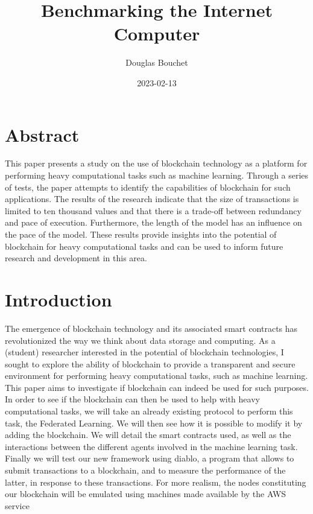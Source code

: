 \documentclass{article}
\title{Benchmarking the Internet Computer}
\date{2023-02-13}
\author{Douglas Bouchet}
\begin{document}
\maketitle
\newpage
{}

\tableofcontents

\newpage
\section{Abstract}
This paper presents a study on the use of blockchain technology as a platform for performing heavy computational tasks
such as machine learning. Through a series of tests, the paper attempts to identify the capabilities of blockchain for
such applications. The results of the research indicate that the size of transactions is limited to ten thousand values
and that there is a trade-off between redundancy and pace of execution. Furthermore, the length of the model has an
influence on the pace of the model. These results provide insights into the potential of blockchain for heavy
computational tasks and can be used to inform future research and development in this area.
\newpage
\section{Introduction}
The emergence of blockchain technology and its associated smart contracts has revolutionized the way we think about data
storage and computing. As a (student) researcher interested in the potential of blockchain technologies, I sought to explore the
ability of blockchain to provide a transparent and secure environment for performing heavy computational tasks, such
as machine learning. This paper aims to investigate if blockchain can indeed be used for such purposes.
In order to see if the blockchain can then be used to help with heavy computational tasks, we will take an already
existing protocol to perform this task, the Federated Learning. We will then see how it is possible to modify it by adding the blockchain.
We will detail the smart contracts used, as well as the interactions between the different agents involved in the
machine learning task. Finally we will test our new framework using diablo, a program that allows to submit transactions
to a blockchain, and to measure the performance of the latter, in response to these transactions. For more realism,
 the nodes constituting our blockchain will be emulated using machines made available by the AWS service
\end{document}
